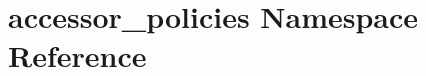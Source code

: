 \hypertarget{namespaceaccessor__policies}{}\section{accessor\+\_\+policies Namespace Reference}
\label{namespaceaccessor__policies}

